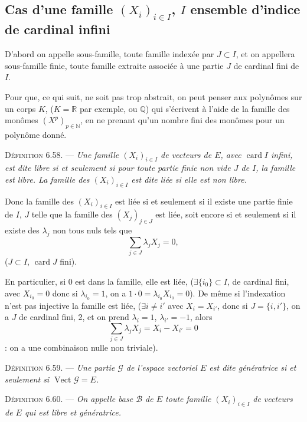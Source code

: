 \subsection*{Cas d'une famille $(X_i)_{i\in I}$, $I$ ensemble d'indice de cardinal infini}

D'abord on appelle sous-famille, toute famille indexée par $J\subset I$, et on appellera sous-famille finie, toute famille extraite associée à une partie $J$ de cardinal fini de $I$.

Pour que, ce qui suit, ne soit pas trop abstrait, on peut penser aux polynômes sur un corps $K$, ($K=\mathbb R$ par exemple, ou $\mathbb Q$) qui s'écrivent à l'aide de la famille des monômes $(X^p)_{p\in\mathbb N}$, en ne prenant qu'un nombre fini des monômes pour un polynôme donné.

\medskip\noindent\textsc{Définition 6.58.} --- \emph{Une famille $(X_i)_{i\in I}$ de vecteurs de $E$, avec $\operatorname{card}I$ infini, est dite libre si et seulement si pour toute partie finie non vide $J$ de $I$, la famille  est libre. La famille des $(X_i)_{i\in I}$ est dite liée si elle est non libre.}

Donc la famille des $(X_i)_{i\in I}$ est liée si et seulement si il existe une partie finie de $I$, $J$ telle que la famille des $(X_j)_{j\in J}$ est liée, soit encore si et seulement si il existe des $\lambda_j$ non tous nuls tels que
\[
\sum_{j\in J}\lambda_jX_j=0,
\]
($J\subset I$, $\operatorname{card}J$ fini).

En particulier, si $0$ est dans la famille, elle est liée, ($\exists\{i_0\}\subset I$, de cardinal fini, avec $X_{i_0}=0$ donc si $\lambda_{i_0}=1$, on a $1\cdot0=\lambda_{i_0}X_{i_0}=0$). De même si l'indexation n'est pas injective la famille est liée, ($\exists i\ne i'$ avec $X_i=X_{i'}$, donc si $J=\{i,i'\}$, on a $J$ de cardinal fini, 2, et on prend $\lambda_i=1$, $\lambda_{i'}=-1$, alors
\[
\sum_{j\in J}\lambda_jX_j=X_i-X_{i'}=0
\]
: on a une combinaison nulle non triviale).

\medskip\noindent\textsc{Définition 6.59.} --- \emph{Une partie $\mathcal G$ de l'espace vectoriel $E$ est dite génératrice si et seulement si $\operatorname{Vect}\mathcal G=E$.}

\medskip\noindent\textsc{Définition 6.60.} --- \emph{On appelle base $\mathcal B$ de $E$ toute famille $(X_i)_{i\in I}$ de vecteurs de $E$ qui est libre et génératrice.}

